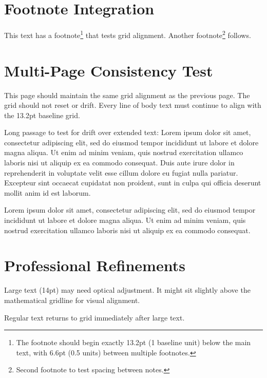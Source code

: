 \documentclass[11pt]{article}
\begin{document}

\section{Footnote Integration}

This text has a footnote\footnote{The footnote should begin exactly 13.2pt (1 baseline unit) below the main text, with 6.6pt (0.5 units) between multiple footnotes.} that tests grid alignment. Another footnote\footnote{Second footnote to test spacing between notes.} follows.


\clearpage

\section{Multi-Page Consistency Test}

This page should maintain the same grid alignment as the previous page. The grid should not reset or drift. Every line of body text must continue to align with the 13.2pt baseline grid.

Long passage to test for drift over extended text: Lorem ipsum dolor sit amet, consectetur adipiscing elit, sed do eiusmod tempor incididunt ut labore et dolore magna aliqua. Ut enim ad minim veniam, quis nostrud exercitation ullamco laboris nisi ut aliquip ex ea commodo consequat. Duis aute irure dolor in reprehenderit in voluptate velit esse cillum dolore eu fugiat nulla pariatur. Excepteur sint occaecat cupidatat non proident, sunt in culpa qui officia deserunt mollit anim id est laborum.

Lorem ipsum dolor sit amet, consectetur adipiscing elit, sed do eiusmod tempor incididunt ut labore et dolore magna aliqua. Ut enim ad minim veniam, quis nostrud exercitation ullamco laboris nisi ut aliquip ex ea commodo consequat.


\section{Professional Refinements}

{\Large Large text (14pt) may need optical adjustment. It might sit slightly above the mathematical gridline for visual alignment.}

Regular text returns to grid immediately after large text.
\end{document}
